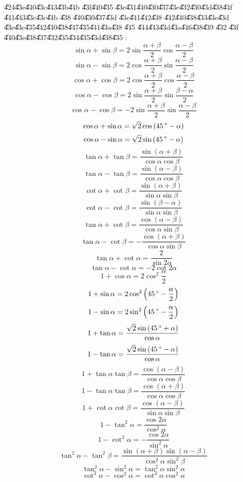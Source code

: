\documentclass{article}
\begin{document}
\U{424}\U{43e}\U{440}\U{43c}\U{443}\U{43b}\U{44b} \U{43f}\U{440}\U{435}%
\U{43e}\U{431}\U{440}\U{430}\U{437}\U{43e}\U{432}\U{430}\U{43d}\U{438}\U{44f}
\U{441}\U{443}\U{43c}\U{43c}\U{44b} \U{438} \U{440}\U{430}\U{437}\U{43d}%
\U{43e}\U{441}\U{442}\U{438} \U{442}\U{440}\U{438}\U{433}\U{43e}\U{43d}%
\U{43e}\U{43c}\U{435}\U{442}\U{440}\U{438}\U{447}\U{435}\U{441}\U{43a}\U{438}%
\U{445} \U{444}\U{443}\U{43d}\U{43a}\U{446}\U{438}\U{439} \U{432} \U{43f}%
\U{440}\U{43e}\U{438}\U{437}\U{432}\U{435}\U{434}\U{435}\U{43d}\U{438}\U{435}%
:%
\[
\sin \alpha +\sin \beta =2\sin \frac{\alpha +\beta }{2}\cos \frac{\alpha
-\beta }{2} 
\]%
\[
\sin \alpha -\sin \beta =2\cos \frac{\alpha +\beta }{2}\sin \frac{\alpha
-\beta }{2} 
\]%
\[
\cos \alpha +\cos \beta =2\cos \frac{\alpha +\beta }{2}\cos \frac{\alpha
-\beta }{2} 
\]%
\[
\cos \alpha -\cos \beta =2\sin \frac{\alpha +\beta }{2}\sin \frac{\beta
-\alpha }{2} 
\]%
\[
\cos \alpha -\cos \beta =-2\sin \frac{\alpha +\beta }{2}\sin \frac{\alpha
-\beta }{2} 
\]%
\[
\cos \alpha +\sin \alpha =\sqrt{2}\cos \left( 45\unit{%
{{}^\circ}%
}-\alpha \right) 
\]%
\[
\cos \alpha -\sin \alpha =\sqrt{2}\sin \left( 45\unit{%
{{}^\circ}%
}-\alpha \right) 
\]%
\[
\tan \alpha +\tan \beta =\frac{\sin \left( \alpha +\beta \right) }{\cos
\alpha \cos \beta } 
\]%
\[
\tan \alpha -\tan \beta =\frac{\sin \left( \alpha -\beta \right) }{\cos
\alpha \cos \beta } 
\]%
\[
\cot \alpha +\cot \beta =\frac{\sin \left( \alpha +\beta \right) }{\sin
\alpha \sin \beta } 
\]%
\[
\cot \alpha -\cot \beta =\frac{\sin \left( \beta -\alpha \right) }{\sin
\alpha \sin \beta } 
\]%
\[
\tan \alpha +\cot \beta =\frac{\cos \left( \alpha -\beta \right) }{\cos
\alpha \sin \beta } 
\]%
\[
\tan \alpha -\cot \beta =-\frac{\cos \left( \alpha +\beta \right) }{\cos
\alpha \sin \beta } 
\]%
\[
\tan \alpha +\cot \alpha =\frac{2}{\sin 2\alpha } 
\]%
\[
\tan \alpha -\cot \alpha =-2\cot 2\alpha 
\]%
\[
1+\cos \alpha =2\cos ^{2}\frac{\alpha }{2} 
\]%
\[
1+\sin \alpha =2\cos ^{2}\left( 45\unit{%
{{}^\circ}%
}-\frac{\alpha }{2}\right) 
\]%
\[
1-\sin \alpha =2\sin ^{2}\left( 45\unit{%
{{}^\circ}%
}-\frac{\alpha }{2}\right) 
\]%
\[
1+\tan \alpha =\frac{\sqrt{2}\sin \left( 45\unit{%
{{}^\circ}%
}+\alpha \right) }{\cos \alpha } 
\]%
\[
1-\tan \alpha =\frac{\sqrt{2}\sin \left( 45\unit{%
{{}^\circ}%
}-\alpha \right) }{\cos \alpha } 
\]%
\[
1+\tan \alpha \tan \beta =\frac{\cos \left( \alpha -\beta \right) }{\cos
\alpha \cos \beta } 
\]%
\[
1-\tan \alpha \tan \beta =\frac{\cos \left( \alpha +\beta \right) }{\cos
\alpha \cos \beta } 
\]%
\[
1+\cot \alpha \cot \beta =\frac{\cos \left( \alpha -\beta \right) }{\sin
\alpha \sin \beta } 
\]%
\[
1-\tan ^{2}\alpha =\frac{\cos 2\alpha }{\cos ^{2}\alpha } 
\]%
\[
1-\cot ^{2}\alpha =-\frac{\cos 2\alpha }{\sin ^{2}\alpha } 
\]%
\[
\tan ^{2}\alpha -\tan ^{2}\beta =\frac{\sin \left( \alpha +\beta \right)
\sin \left( \alpha -\beta \right) }{\cos ^{2}\alpha \sin ^{2}\beta } 
\]%
\[
\tan ^{2}\alpha -\sin ^{2}\alpha =\tan ^{2}\alpha \sin ^{2}\alpha 
\]%
\[
\cot ^{2}\alpha -\cos ^{2}\alpha =\cot ^{2}\alpha \cos ^{2}\alpha 
\]
\end{document}
